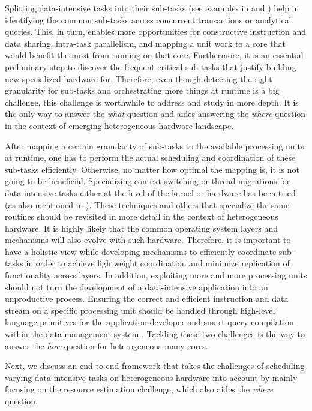 \documentclass[11pt]{article}
\begin{document}
Splitting data-intensive tasks into their sub-tasks
(see examples in  and )
help in identifying the common sub-tasks across concurrent transactions or analytical queries.
This, in turn, enables more opportunities for constructive instruction and data sharing,
intra-task parallelism, and mapping a unit work to a core that would benefit the most from running on that core.
Furthermore, it is an essential preliminary step to 
discover the frequent critical sub-tasks that justify building new specialized hardware for.
Therefore,
even though detecting the right granularity for sub-tasks and orchestrating more things at runtime is a big challenge,
this challenge is worthwhile to address and study in more depth.
It is the only way to answer the \textit{what} question and aides answering the \textit{where} question
in the context of emerging heterogeneous hardware landscape.

After mapping a certain granularity of sub-tasks to the available processing units at runtime,
one has to perform the actual scheduling and coordination of these sub-tasks efficiently.
Otherwise, no matter how optimal the mapping is, it is not going to be beneficial.
Specializing context switching or thread migrations for data-intensive tasks
either at the level of the kernel or hardware has been tried (as also mentioned in ).
These techniques and others that specialize the same routines
should be revisited in more detail in the context of heterogeneous hardware.
It is highly likely that the common operating system layers and mechanisms will also evolve with such hardware.
Therefore, it is important to have a holistic view while developing mechanisms to efficiently coordinate sub-tasks
in order to achieve lightweight coordination and minimize replication of functionality across layers.
In addition, exploiting more and more processing units should not turn the development
of a data-intensive application into an unproductive process.
Ensuring the correct and efficient instruction and data stream on a specific processing unit should be handled through
high-level language primitives for the application developer and smart query compilation within the data management system
\cite{HeimelSPMM13}.
Tackling these two challenges is the way to answer the \textit{how} question for heterogeneous many cores.

Next, we discuss an end-to-end framework that takes the challenges of scheduling varying data-intensive tasks
on heterogeneous hardware into account by mainly focusing on the resource estimation challenge,
which also aides the \textit{where} question.
\end{document}
